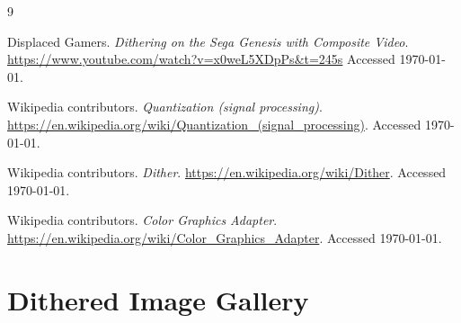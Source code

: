\documentclass[10pt,a4paper]{article}
\begin{document}
\newpage

\begin{thebibliography}{9}

Displaced Gamers.
\emph{Dithering on the Sega Genesis with Composite Video}.
\url{https://www.youtube.com/watch?v=x0weL5XDpPs&t=245s}
Accessed \today.

Wikipedia contributors.
\emph{Quantization (signal processing)}.
\url{https://en.wikipedia.org/wiki/Quantization_(signal_processing)}.
Accessed \today.

Wikipedia contributors.
\emph{Dither}.
\url{https://en.wikipedia.org/wiki/Dither}.
Accessed \today.

Wikipedia contributors.
\emph{Color Graphics Adapter}.
\url{https://en.wikipedia.org/wiki/Color_Graphics_Adapter}.
Accessed \today.

\end{thebibliography}

\newpage

\appendix
\section{Dithered Image Gallery}
\label{app:gallery}
\end{document}
